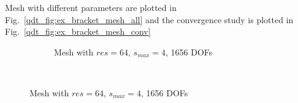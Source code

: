 %
%
%
%
%
Mesh with different parameters are plotted in Fig.~\ref{qdt_fig:ex_bracket_mesh_all} and the convergence study is plotted in Fig.~\ref{qdt_fig:ex_bracket_mesh_conv}
%
\begin{figure}[H]
    \begin{subfigure}[b]{1\linewidth}
        \centering
        \caption{Mesh with $res=64$, $s_{max}=4$, 1656 DOFs}
    \end{subfigure}
    \\
\end{figure}

